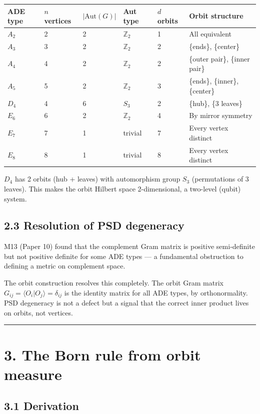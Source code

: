 \documentclass[11pt,a4paper]{article}
\begin{document}
\begin{longtable}[]{@{}llllll@{}}
\toprule
ADE type & $n$ vertices & $|\text{Aut}(G)|$ & Aut type & $d$ orbits & Orbit structure \\
\midrule\endhead
$A_2$ & 2 & 2 & $\mathbb{Z}_2$ & 1 & All equivalent \\
$A_3$ & 3 & 2 & $\mathbb{Z}_2$ & 2 & \{ends\}, \{center\} \\
$A_4$ & 4 & 2 & $\mathbb{Z}_2$ & 2 & \{outer pair\}, \{inner pair\} \\
$A_5$ & 5 & 2 & $\mathbb{Z}_2$ & 3 & \{ends\}, \{inner\}, \{center\} \\
$D_4$ & 4 & 6 & $S_3$ & 2 & \{hub\}, \{3 leaves\} \\
$E_6$ & 6 & 2 & $\mathbb{Z}_2$ & 4 & By mirror symmetry \\
$E_7$ & 7 & 1 & trivial & 7 & Every vertex distinct \\
$E_8$ & 8 & 1 & trivial & 8 & Every vertex distinct \\
\bottomrule
\end{longtable}

$D_4$ has 2 orbits (hub + leaves) with automorphism group $S_3$ (permutations of 3 leaves). This makes the orbit Hilbert space 2-dimensional, a two-level (qubit) system.

\subsection*{2.3 Resolution of PSD degeneracy}

M13 (Paper 10) found that the complement Gram matrix is positive semi-definite but not positive definite for some ADE types — a fundamental obstruction to defining a metric on complement space.

The orbit construction resolves this completely. The orbit Gram matrix $G_{ij} = \langle O_i | O_j \rangle = \delta_{ij}$ is the identity matrix for all ADE types, by orthonormality. PSD degeneracy is not a defect but a signal that the correct inner product lives on orbits, not vertices.

\begin{center}\rule{0.5\linewidth}{0.4pt}\end{center}

\section*{3. The Born rule from orbit measure}

\subsection*{3.1 Derivation}
\end{document}

